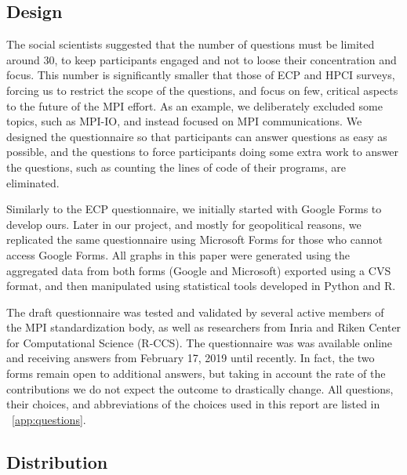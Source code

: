 \documentclass[preprint,5p,times]{elsarticle}
\begin{document}
\subsection*{Design}
%
The social scientists suggested that the number of questions must be limited
around 30, to keep participants engaged and not to loose their concentration and
focus. This number is significantly smaller that those of ECP and HPCI surveys,
forcing us to restrict the scope of the questions, and focus on few, critical
aspects to the future of the MPI effort. As an example, we deliberately excluded
some topics, such as MPI-IO, and instead focused on MPI communications.
We designed the questionnaire so that participants can answer questions
as easy as possible, and the questions to force participants doing
some extra work to answer the questions, such as counting the lines of
code of their programs, are eliminated.

Similarly to the ECP questionnaire, we initially started with Google Forms to
develop ours. Later in our project, and mostly for geopolitical reasons, we
replicated the same questionnaire using Microsoft Forms for those who cannot
access Google Forms. All graphs in this paper were generated using the
aggregated data from both forms (Google and Microsoft) exported using a CVS
format, and then manipulated using statistical tools developed in Python and R.

The draft questionnaire was tested and validated by several active members of
the MPI standardization body, as well as researchers from Inria and Riken Center
for Computational Science (R-CCS).
The questionnaire was was available online and receiving answers from February
17, 2019 until recently. In fact, the two forms remain open to additional
answers, but taking in account the rate of the contributions we do not expect
the outcome to drastically change.
All questions, their choices, and abbreviations of the choices used in
this report are listed in ~\ref{app:questions}.

\subsection*{Distribution}
\end{document}

